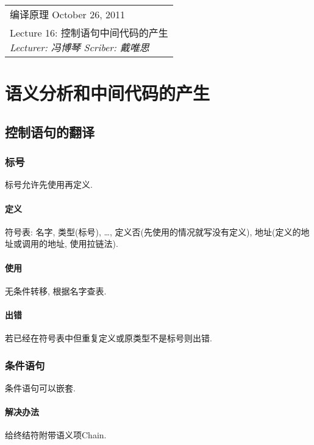 \def\lecture{16}
\clearpage \noindent\begin{tabularx}{\linewidth}{|X|}
\hline \vskip -2mm
{\sf 编译原理} \hfill October 26, 2011 \\
{\centering \sf \large Lecture \lecture:
控制语句中间代码的产生 \\ }
\textsl{Lecturer: 冯博琴 \hfill Scriber: 戴唯思}\\ \hline
\end{tabularx}
\setcounter{section}{0}
\renewcommand{\thepage}{\lecture -\arabic{page}}

\section{语义分析和中间代码的产生}

    \subsection{控制语句的翻译}

        \subsubsection{标号}

           标号允许先使用再定义.

            \paragraph{定义}

                符号表: 名字, 类型(标号), \ldots, 定义否(先使用的情况就写没有定义), 地址(定义的地址或调用的地址, 使用拉链法).

            \paragraph{使用}

                无条件转移, 根据名字查表.

            \paragraph{出错}

                若已经在符号表中但重复定义或原类型不是标号则出错.

        \subsubsection{条件语句}

            条件语句可以嵌套.

            \paragraph{解决办法}

                给终结符附带语义项Chain.
